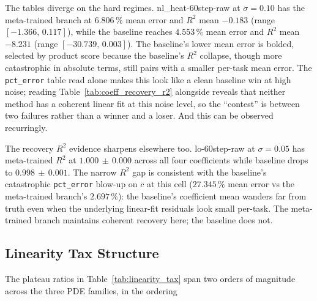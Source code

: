 \documentclass[10pt,journal,compsoc]{IEEEtran}
\begin{document}
The tables diverge on the hard regimes. nl\_heat-60step-raw at
$\sigma{=}0.10$ has the meta-trained branch at $6.806\,\%$ mean error
and $R^2$ mean $-0.183$ (range $[-1.366,\,0.117]$), while the baseline
reaches $4.553\,\%$ mean error and $R^2$ mean $-8.231$ (range
$[-30.739,\,0.003]$). The baseline's lower mean error is bolded,
selected by product score because the baseline's $R^2$ collapse,
though more catastrophic in absolute terms, still pairs with a
smaller per-task mean error. The \texttt{pct\_error} table read alone makes
this look like a clean baseline win at high noise; reading
Table~\ref{tab:coeff_recovery_r2} alongside reveals that neither
method has a coherent linear fit at this noise level, so the
``contest'' is between two failures rather than a winner and a loser. And this
can be observed recurringly.

The recovery $R^2$ evidence sharpens elsewhere too. lo-60step-raw at
$\sigma{=}0.05$ has meta-trained $R^2$ at $1.000\,\pm\,0.000$ across
all four coefficients while baseline drops to $0.998\,\pm\,0.001$.
The narrow $R^2$ gap is consistent with the baseline's catastrophic
\texttt{pct\_error} blow-up on $c$ at this cell ($27.345\,\%$ mean error vs the
meta-trained branch's $2.697\,\%$): the baseline's coefficient mean
wanders far from truth even when the underlying linear-fit residuals
look small per-task. The meta-trained branch maintains coherent
recovery here; the baseline does not.

\subsection{Linearity Tax Structure}\label{subsec:eval_linearity_tax}

The plateau ratios in Table~\ref{tab:linearity_tax} span two orders of
magnitude across the three PDE families, in the ordering 
\end{document}
